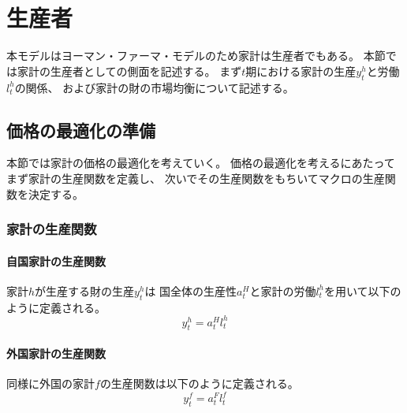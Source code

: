 
\section{生産者}
\label{sec:model_producers}
本モデルはヨーマン・ファーマ・モデルのため家計は生産者でもある。
本節では家計の生産者としての側面を記述する。
まず\(t\)期における家計の生産\(y_t^h\)と労働\(l_t^h\)の関係、
および家計の財の市場均衡について記述する。

\subsection{価格の最適化の準備}
\label{sec:model_producers_preparation}
本節では家計の価格の最適化を考えていく。
価格の最適化を考えるにあたってまず家計の生産関数を定義し、
次いでその生産関数をもちいてマクロの生産関数を決定する。

\subsubsection{家計の生産関数}
\label{sec:model_producers_preparation_production_function}

\paragraph{自国家計の生産関数}
\label{sec:model_producers_preparation_production_function_home}
家計\(h\)が生産する財の生産\(y_t^h\)は
国全体の生産性\(a_t^H\)と家計の労働\(l_t^h\)を用いて以下のように定義される。
\begin{equation}
\label{form:model_producers_preparation_production_function_home_eq}
    y_t^h=a_t^Hl_t^h
\end{equation}

\paragraph{外国家計の生産関数}
\label{sec:model_producers_preparation_household_production_function_foreign}
同様に外国の家計\(f\)の生産関数は以下のように定義される。
\begin{equation}
\label{form:model_producers_preparation_household_production_function_foreign_eq}
    y_t^f=a_t^Fl_t^f
\end{equation}

